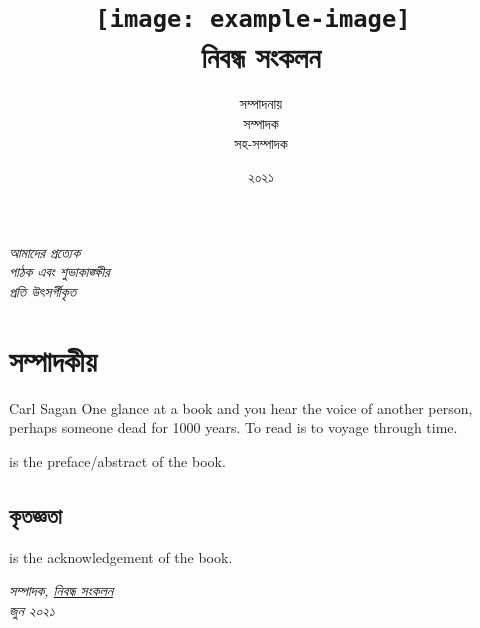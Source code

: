 \title{
\texttt{[image: example-image]}~\\[0.5cm]
নিবন্ধ সংকলন}
\author{\footnotesize{সম্পাদনায়} \\ 
সম্পাদক\\ 
সহ-সম্পাদক}

\date{\small ২০২১}

\begin{titlepage}

\thispagestyle{empty}
\maketitle
\end{titlepage}


\pagestyle{empty}
\begin{flushright}
\itshape
আমাদের প্রত্যেক \\ পাঠক এবং শুভাকাঙ্ক্ষীর \\ প্রতি উৎসর্গীকৃত
\end{flushright}

\cleardoublepage

\newpage
\pagestyle{plain}

\chapter{সম্পাদকীয়}
\begin{chapquote}{Carl Sagan}
	One glance at a book and you hear the voice of another person, perhaps someone dead for 1000 years. To read is to voyage through time.
\end{chapquote}

 is the preface/abstract of the book.
\blindtext \\

\section*{কৃতজ্ঞতা}
 is the acknowledgement of the book.
\blindtext \\

\begin{flushright}
\itshape
সম্পাদক, \href{<url>}{নিবন্ধ সংকলন} \\ জুন ২০২১
\end{flushright}

\cleardoublepage

\setcounter{tocdepth}{0}
\tableofcontents

\newpage
\pagestyle{plain}
